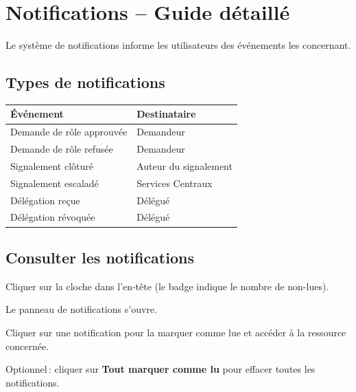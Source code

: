 
\section{Notifications -- Guide d\'etaill\'e}
\label{sec:notifications_detail}

Le syst\`eme de notifications informe les utilisateurs des \'ev\'enements les concernant.

\subsection{Types de notifications}

\medskip
\begin{tabularx}{\textwidth}{L{5cm}X}
  \toprule
  \textbf{\'Ev\'enement} & \textbf{Destinataire} \\
  \midrule
  Demande de r\^ole approuv\'ee   & Demandeur \\
  Demande de r\^ole refus\'ee     & Demandeur \\
  Signalement cl\^otur\'e        & Auteur du signalement \\
  Signalement escalad\'e         & Services Centraux \\
  D\'el\'egation re\c{c}ue       & D\'el\'egu\'e \\
  D\'el\'egation r\'evoqu\'ee    & D\'el\'egu\'e \\
  \bottomrule
\end{tabularx}

\subsection{Consulter les notifications}

\begin{steps}
  \item Cliquer sur la cloche \faBell{} dans l'en-t\^ete (le badge indique le nombre de non-lues).
  \item Le panneau de notifications s'ouvre.
  \item Cliquer sur une notification pour la marquer comme lue et acc\'eder \`a la ressource concern\'ee.
  \item Optionnel\,: cliquer sur \textbf{Tout marquer comme lu} pour effacer toutes les notifications.
\end{steps}

